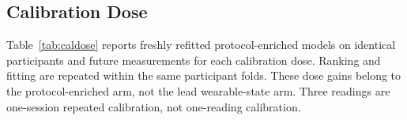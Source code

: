 \documentclass[journal]{IEEEtran}
\begin{document}
\subsection{Calibration Dose}
\label{sec:caldose}
Table~\ref{tab:caldose} reports freshly refitted protocol-enriched models on identical participants and future measurements for each calibration dose. Ranking and fitting are repeated within the same participant folds. These dose gains belong to the protocol-enriched arm, not the lead wearable-state arm. Three readings are one-session repeated calibration, not one-reading calibration.
\begin{table}[t]
\centering
\caption{Refitted Protocol-Enriched Models by Calibration Dose (653 Participants)}
\label{tab:caldose}
\scriptsize
{}
\end{table}
\end{document}
